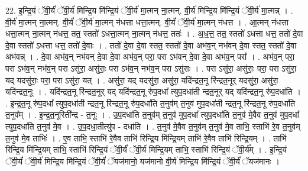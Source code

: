 \documentclass[17pt]{extarticle}
\begin{document}
22. इ॒न्द्रि॒यं ॅवी॒र्यं॑ ॅवी॒र्य॑ मिन्द्रि॒य मि॑न्द्रि॒यं ॅवी॒र्य॑ मा॒त्मन् ना॒त्मन्. वी॒र्य॑ मिन्द्रि॒य मि॑न्द्रि॒यं ॅवी॒र्य॑ मा॒त्मन्न् । . वी॒र्य॑ मा॒त्मन् ना॒त्मन्. वी॒र्यं॑ ॅवी॒र्य॑ मा॒त्मन् न॑धत्ता धत्ता॒त्मन्. वी॒र्यं॑ ॅवी॒र्य॑ मा॒त्मन् न॑धत्त । . आ॒त्मन् न॑धत्ता धत्ता॒त्मन् ना॒त्मन् न॑धत्त॒ तत॒ स्ततो॑ ऽधत्ता॒त्मन् ना॒त्मन् न॑धत्त॒ ततः॑ । . अ॒ध॒त्त॒ तत॒ स्ततो॑ ऽधत्ता धत्त॒ ततो॑ दे॒वा दे॒वा स्ततो॑ ऽधत्ता धत्त॒ ततो॑ दे॒वाः । . ततो॑ दे॒वा दे॒वा स्तत॒ स्ततो॑ दे॒वा अभ॑व॒न् नभ॑वन् दे॒वा स्तत॒ स्ततो॑ दे॒वा अभ॑वन्न् । . दे॒वा अभ॑व॒न् नभ॑वन् दे॒वा दे॒वा अभ॑व॒न् परा॒ परा ऽभ॑वन् दे॒वा दे॒वा अभ॑व॒न् परा᳚ । . अभ॑व॒न् परा॒ परा ऽभ॑व॒न् नभ॑व॒न् परा ऽसु॑रा॒ असु॑राः॒ परा ऽभ॑व॒न् नभ॑व॒न् परा ऽसु॑राः । . परा ऽसु॑रा॒ असु॑राः॒ परा॒ परा ऽसु॑रा॒ यद् यदसु॑राः॒ परा॒ परा ऽसु॑रा॒ यत् । . असु॑रा॒ यद् यदसु॑रा॒ असु॑रा॒ यदि॑न्द्रत॒नू रि॑न्द्रत॒नूर् यदसु॑रा॒ असु॑रा॒ यदि॑न्द्रत॒नूः । . यदि॑न्द्रत॒नू रि॑न्द्रत॒नूर् यद् यदि॑न्द्रत॒नू रु॑प॒दधा᳚ त्युप॒दधा॑ती न्द्रत॒नूर् यद् यदि॑न्द्रत॒नू रु॑प॒दधा॑ति । . इ॒न्द्र॒त॒नू रु॑प॒दधा᳚ त्युप॒दधा॑ती न्द्रत॒नू रि॑न्द्रत॒नू रु॑प॒दधा॑ति त॒नुव॑म् त॒नुव॑ मुप॒दधा॑ती न्द्रत॒नू रि॑न्द्रत॒नू रु॑प॒दधा॑ति त॒नुव᳚म् । . इ॒न्द्र॒त॒नूरिती᳚न्द्र - त॒नूः । . उ॒प॒दधा॑ति त॒नुव॑म् त॒नुव॑ मुप॒दधा᳚ त्युप॒दधा॑ति त॒नुव॑ मे॒वैव त॒नुव॑ मुप॒दधा᳚ त्युप॒दधा॑ति त॒नुव॑ मे॒व । . उ॒प॒दधा॒तीत्यु॑प - दधा॑ति । . त॒नुव॑ मे॒वैव त॒नुव॑म् त॒नुव॑ मे॒व ताभि॒ स्ताभि॑ रे॒व त॒नुव॑म् त॒नुव॑ मे॒व ताभिः॑ । . ए॒व ताभि॒ स्ताभि॑ रे॒वैव ताभि॑ रिन्द्रि॒य मि॑न्द्रि॒यम् ताभि॑ रे॒वैव ताभि॑ रिन्द्रि॒यम् । . ताभि॑ रिन्द्रि॒य मि॑न्द्रि॒यम् ताभि॒ स्ताभि॑ रिन्द्रि॒यं ॅवी॒र्यं॑ ॅवी॒र्य॑ मिन्द्रि॒यम् ताभि॒ स्ताभि॑ रिन्द्रि॒यं ॅवी॒र्य᳚म् । . इ॒न्द्रि॒यं ॅवी॒र्यं॑ ॅवी॒र्य॑ मिन्द्रि॒य मि॑न्द्रि॒यं ॅवी॒र्यं॑ ॅयज॑मानो॒ यज॑मानो वी॒र्य॑ मिन्द्रि॒य मि॑न्द्रि॒यं ॅवी॒र्यं॑ ॅयज॑मानः । \newline
\end{document}
